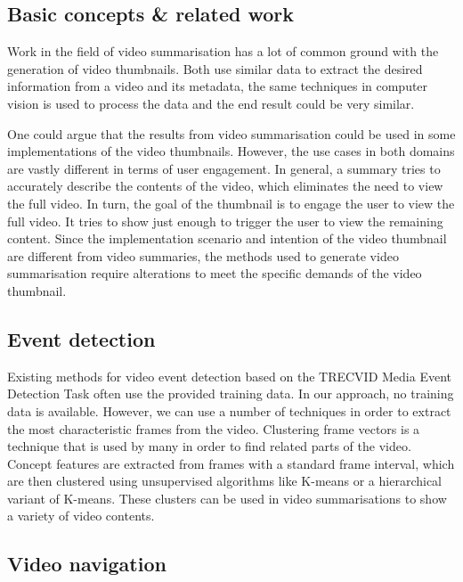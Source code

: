 \documentclass{../resources/sig-alternate-05-2015}
\begin{document}
\subsection{Basic concepts \& related work}
\label{related work}

Work in the field of video summarisation has a lot of common ground with the generation of video thumbnails. Both use similar data to extract the desired information from a video and its metadata, the same techniques in computer vision is used to process the data and the end result could be very similar. 

One could argue that the results from video summarisation could be used in some implementations of the video thumbnails. However, the use cases in both domains are vastly different in terms of user engagement. In general, a summary tries to accurately describe the contents of the video, which eliminates the need to view the full video. In turn, the goal of the thumbnail is to engage the user to view the full video. It tries to show just enough to trigger the user to view the remaining content. Since the implementation scenario and intention of the video thumbnail are different from video summaries, the methods used to generate video summarisation require alterations to meet the specific demands of the video thumbnail.

\subsection{Event detection}

Existing methods for video event detection based on the TRECVID Media Event Detection Task often use the provided training data. In our approach, no training data is available. However, we can use a number of techniques in order to extract the most characteristic frames from the video. Clustering frame vectors is a technique that is used by many in order to find related parts of the video. Concept features are extracted from frames with a standard frame interval, which are then clustered using unsupervised algorithms like K-means or a hierarchical variant of K-means. These clusters can be used in video summarisations to show a variety of video contents. 

\subsection{Video navigation}
\label{video navigation}
\end{document}
